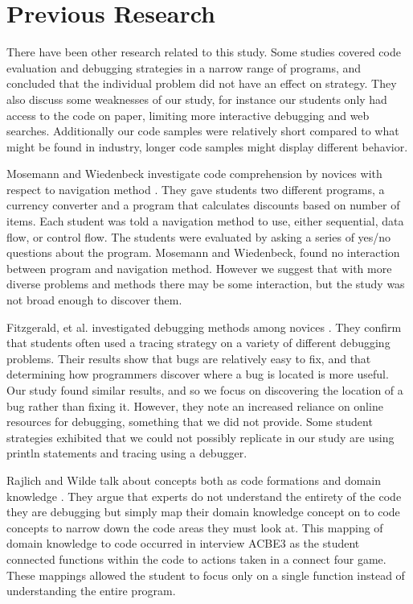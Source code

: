 \section{Previous Research}

There have been other research related to this study.
Some studies covered code evaluation and debugging strategies in a narrow range of programs,
 and concluded that the individual problem did not have an effect on strategy.
They also discuss some weaknesses of our study, for instance our students only had access to the code on paper, limiting more interactive debugging and web searches.
Additionally our code samples were relatively short compared to what might be found in industry,
 longer code samples might display different behavior.

Mosemann and Wiedenbeck investigate code comprehension by novices with respect to navigation method \cite{mosemann2001}.
They gave students two different programs, a currency converter and a program that calculates discounts based on number of items.
Each student was told a navigation method to use, either sequential, data flow, or control flow.
The students were evaluated by asking a series of yes/no questions about the program.
Mosemann and Wiedenbeck, found no interaction between program and navigation method.
However we suggest that with more diverse problems and methods there may be some interaction, but the study was not broad enough to discover them.

Fitzgerald, et al. investigated debugging methods among novices \cite{fitzgerald2008}.
They confirm that students often used a tracing strategy on a variety of different debugging problems.
Their results show that bugs are relatively easy to fix, and that determining how programmers discover where a bug is located is more useful.
Our study found similar results, and so we focus on discovering the location of a bug rather than fixing it.
However, they note an increased reliance on online resources for debugging, something that we did not provide.
Some student strategies exhibited that we could not possibly replicate in our study are using println statements and tracing using a debugger.

Rajlich and Wilde talk about concepts both as code formations and domain knowledge \cite{1021348}.
They argue that experts do not understand the entirety of the code they are debugging but simply map their domain knowledge concept on to code concepts to narrow down the code areas they must look at.
This mapping of domain knowledge to code occurred in interview ACBE3 as the student connected functions within the code to actions taken in a connect four game.
These mappings allowed the student to focus only on a single function instead of understanding the entire program.

